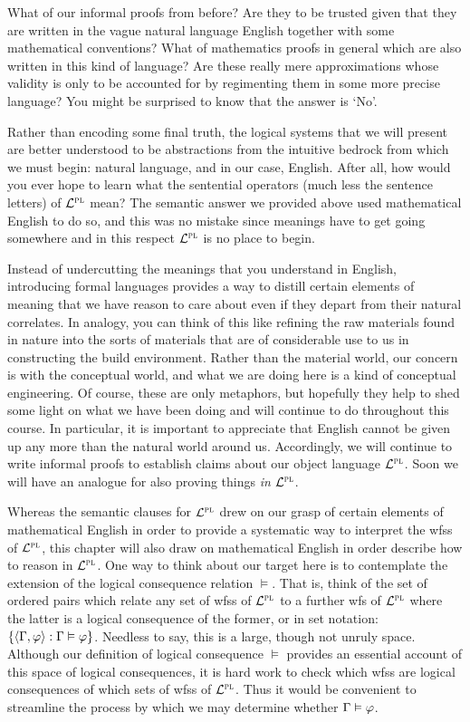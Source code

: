 What of our informal proofs from before?
Are they to be trusted given that they are written in the vague natural language English together with some mathematical conventions? 
What of mathematics proofs in general which are also written in this kind of language?
Are these really mere approximations whose validity is only to be accounted for by regimenting them in some more precise language?
You might be surprised to know that the answer is `No'.

Rather than encoding some final truth, the logical systems that we will present are better understood to be abstractions from the intuitive bedrock from which we must begin: natural language, and in our case, English.
After all, how would you ever hope to learn what the sentential operators (much less the sentence letters) of $\mathcal{L}^{\textsc{pl}}$ mean? 
The semantic answer we provided above used mathematical English to do so, and this was no mistake since meanings have to get going somewhere and in this respect $\mathcal{L}^{\textsc{pl}}$ is no place to begin.

Instead of undercutting the meanings that you understand in English, introducing formal languages provides a way to distill certain elements of meaning that we have reason to care about even if they depart from their natural correlates. 
In analogy, you can think of this like refining the raw materials found in nature into the sorts of materials that are of considerable use to us in constructing the build environment.
Rather than the material world, our concern is with the conceptual world, and what we are doing here is a kind of conceptual engineering.
Of course, these are only metaphors, but hopefully they help to shed some light on what we have been doing and will continue to do throughout this course.
In particular, it is important to appreciate that English cannot be given up any more than the natural world around us.
Accordingly, we will continue to write informal proofs to establish claims about our object language $\mathcal{L}^{\textsc{pl}}$.
Soon we will have an analogue for also proving things \textit{in} $\mathcal{L}^{\textsc{pl}}$.

Whereas the semantic clauses for $\mathcal{L}^{\textsc{pl}}$ drew on our grasp of certain elements of mathematical English in order to provide a systematic way to interpret the wfss of $\mathcal{L}^{\textsc{pl}}$, this chapter will also draw on mathematical English in order describe how to reason in $\mathcal{L}^{\textsc{pl}}$.
One way to think about our target here is to contemplate the extension of the logical consequence relation $\vDash$.
That is, think of the set of ordered pairs which relate any set of wfss of $\mathcal{L}^{\textsc{pl}}$ to a further wfs of $\mathcal{L}^{\textsc{pl}}$ where the latter is a logical consequence of the former, or in set notation: $\lbrace\langle\Gamma, \varphi\rangle : \Gamma \vDash \varphi\rbrace$.
Needless to say, this is a large, though not unruly space.
Although our definition of logical consequence $\vDash$ provides an essential account of this space of logical consequences, it is hard work to check which wfss are logical consequences of which sets of wfss of $\mathcal{L}^{\textsc{pl}}$. 
Thus it would be convenient to streamline the process by which we may determine whether $\Gamma \vDash \varphi$.

